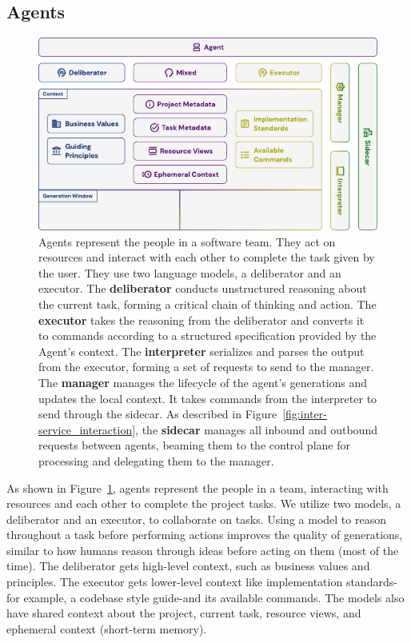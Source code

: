 \documentclass[a4paper,twocolumn,11pt]{quantumarticle}
\begin{document}
\subsection{Agents}
\begin{figure}[t]
  \centering
  \includegraphics[width=\textwidth]{figures/agent.pdf}
  \caption{Agents represent the people in a software team. They act on resources and interact with each other to complete the task given by the user. They use two language models, a deliberator and an executor. The \textbf{deliberator} conducts unstructured reasoning about the current task, forming a critical chain of thinking and action. The \textbf{executor} takes the reasoning from the deliberator and converts it to commands according to a structured specification provided by the Agent's context. The \textbf{interpreter} serializes and parses the output from the executor, forming a set of requests to send to the manager. The \textbf{manager} manages the lifecycle of the agent's generations and updates the local context. It takes commands from the interpreter to send through the sidecar. As described in Figure~\ref{fig:inter-service_interaction}, the \textbf{sidecar} manages all inbound and outbound requests between agents, beaming them to the control plane for processing and delegating them to the manager.}
  \label{fig:agent}
\end{figure}
As shown in Figure~\ref{fig:agent}, agents represent the people in a team, interacting with resources and each other to complete the project tasks. We utilize two models, a deliberator and an executor, to collaborate on tasks. Using a model to reason throughout a task before performing actions improves the quality of generations\cite{Fu2023Improving}, similar to how humans reason through ideas before acting on them (most of the time). The deliberator gets high-level context, such as business values and principles. The executor gets lower-level context like implementation standards-for example, a codebase style guide-and its available commands. The models also have shared context about the project, current task, resource views, and ephemeral context (short-term memory).
\end{document}
